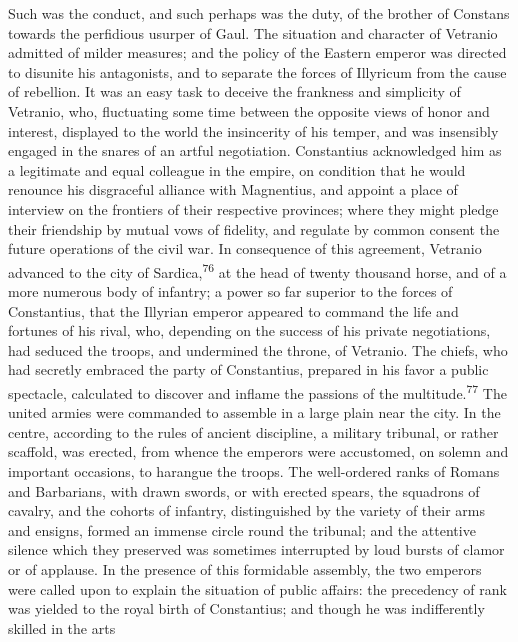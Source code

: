 
Such was the conduct, and such perhaps was the duty, of the
brother of Constans towards the perfidious usurper of Gaul. The
situation and character of Vetranio admitted of milder measures;
and the policy of the Eastern emperor was directed to disunite
his antagonists, and to separate the forces of Illyricum from the
cause of rebellion. It was an easy task to deceive the frankness
and simplicity of Vetranio, who, fluctuating some time between
the opposite views of honor and interest, displayed to the world
the insincerity of his temper, and was insensibly engaged in the
snares of an artful negotiation. Constantius acknowledged him as
a legitimate and equal colleague in the empire, on condition that
he would renounce his disgraceful alliance with Magnentius, and
appoint a place of interview on the frontiers of their respective
provinces; where they might pledge their friendship by mutual
vows of fidelity, and regulate by common consent the future
operations of the civil war. In consequence of this agreement,
Vetranio advanced to the city of Sardica,\textsuperscript{76} at the head of
twenty thousand horse, and of a more numerous body of infantry; a
power so far superior to the forces of Constantius, that the
Illyrian emperor appeared to command the life and fortunes of his
rival, who, depending on the success of his private negotiations,
had seduced the troops, and undermined the throne, of Vetranio.
The chiefs, who had secretly embraced the party of Constantius,
prepared in his favor a public spectacle, calculated to discover
and inflame the passions of the multitude.\textsuperscript{77} The united armies
were commanded to assemble in a large plain near the city. In the
centre, according to the rules of ancient discipline, a military
tribunal, or rather scaffold, was erected, from whence the
emperors were accustomed, on solemn and important occasions, to
harangue the troops. The well-ordered ranks of Romans and
Barbarians, with drawn swords, or with erected spears, the
squadrons of cavalry, and the cohorts of infantry, distinguished
by the variety of their arms and ensigns, formed an immense
circle round the tribunal; and the attentive silence which they
preserved was sometimes interrupted by loud bursts of clamor or
of applause. In the presence of this formidable assembly, the two
emperors were called upon to explain the situation of public
affairs: the precedency of rank was yielded to the royal birth of
Constantius; and though he was indifferently skilled in the arts
